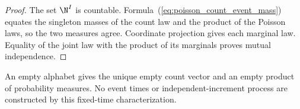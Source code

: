 \begin{proof}
    \leanok
    The set $\N^I$ is countable.  Formula~(\ref{eq:poisson_count_event_mass})
    equates the singleton masses of the count law and the product of the
    Poisson laws, so the two measures agree.  Coordinate projection gives
    each marginal law.  Equality of the joint law with the product of its
    marginals proves mutual independence.
\end{proof}

An empty alphabet gives the unique empty count vector and an empty product
of probability measures.  No event times or independent-increment process
are constructed by this fixed-time characterization.
